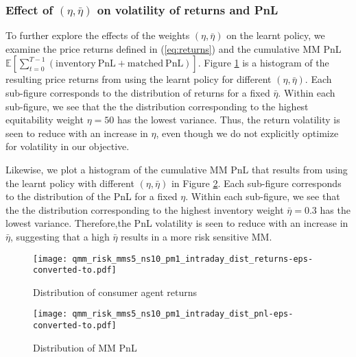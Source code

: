 \documentclass[sigconf]{acmart}
\begin{document}
\subsubsection{Effect of $(\eta,\bar\eta)$ on volatility of returns and PnL}

To further explore the effects of the weights $(\eta,\bar\eta)$ on the learnt policy, we examine the price returns defined in (\ref{eq:returns}) and the cumulative MM PnL $\mathbb{E}\left[\sum_{t=0}^{T-1}\left(\mathrm{inventory\ PnL}+\mathrm{matched\ PnL}\right)\right]$. Figure \ref{fig:returns_dist} is a histogram of the resulting price returns from using the learnt policy for different $(\eta,\bar\eta)$. Each sub-figure corresponds to the distribution of returns for a fixed $\bar\eta$. Within each sub-figure, we see that the the distribution corresponding to the highest equitability weight $\eta=50$ has the lowest variance. Thus, the return volatility is seen to reduce with an increase in $\eta$, even though we do not explicitly optimize for volatility in our objective.

Likewise, we plot a histogram of the cumulative MM PnL that results from using the learnt policy with different $(\eta,\bar\eta)$ in Figure \ref{fig:pnl_dist}. Each sub-figure corresponds to the distribution of the PnL for a fixed $\eta$. Within each sub-figure, we see that the the distribution corresponding to the highest inventory weight $\bar\eta=0.3$ has the lowest variance. Therefore,the PnL volatility is seen to reduce with an increase in $\bar\eta$, suggesting that a high $\bar\eta$ results in a more risk sensitive MM.
\begin{figure}
    \centering
    \texttt{[image: qmm\_risk\_mms5\_ns10\_pm1\_intraday\_dist\_returns-eps-converted-to.pdf]}
    \caption{Distribution of consumer agent returns}
    \label{fig:returns_dist}
\end{figure}
\begin{figure}
    \centering
    \texttt{[image: qmm\_risk\_mms5\_ns10\_pm1\_intraday\_dist\_pnl-eps-converted-to.pdf]}
    \caption{Distribution of MM PnL}
    \label{fig:pnl_dist}
\end{figure}
\end{document}
